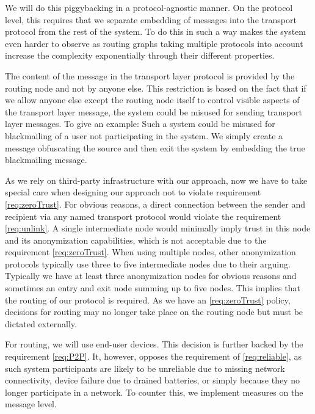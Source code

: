 We will do this piggybacking in a protocol-agnostic manner. On the protocol level, this requires that we separate embedding of messages into the transport protocol from the rest of the system. To do this in such a way makes the system even harder to observe as routing graphs taking multiple protocols into account increase the complexity exponentially through their different properties.

The content of the message in the transport layer protocol is provided by the routing node and not by anyone else. This restriction is based on the fact that if we allow anyone else except the routing node itself to control visible aspects of the transport layer message, the system could be misused for sending transport layer messages. To give an example: Such a system could be misused for blackmailing of a user not participating in the system. We simply create a message obfuscating the source and then exit the system by embedding the true blackmailing message. 

As we rely on third-party infrastructure with our approach, now we have to take special care when designing our approach not to violate requirement \ref{req:zeroTrust}. For obvious reasons, a direct connection between the sender and recipient via any named transport protocol would violate the requirement \ref{req:unlink}. A single intermediate node would minimally imply trust in this node and its anonymization capabilities, which is not acceptable due to the requirement \ref{req:zeroTrust}. When using multiple nodes, other anonymization protocols typically use three to five intermediate nodes due to their arguing. Typically we have at least three anonymization nodes for obvious reasons and sometimes an entry and exit node summing up to five nodes. This implies that the routing of our protocol is required. As we have an \ref{req:zeroTrust} policy, decisions for routing may no longer take place on the routing node but must be dictated externally. 

For routing, we will use end-user devices. This decision is further backed by the requirement \ref{req:P2P}. It, however, opposes the requirement of \ref{req:reliable}, as such system participants are likely to be unreliable due to missing network connectivity, device failure due to drained batteries, or simply because they no longer participate in a network. To counter this, we implement measures on the message level.

